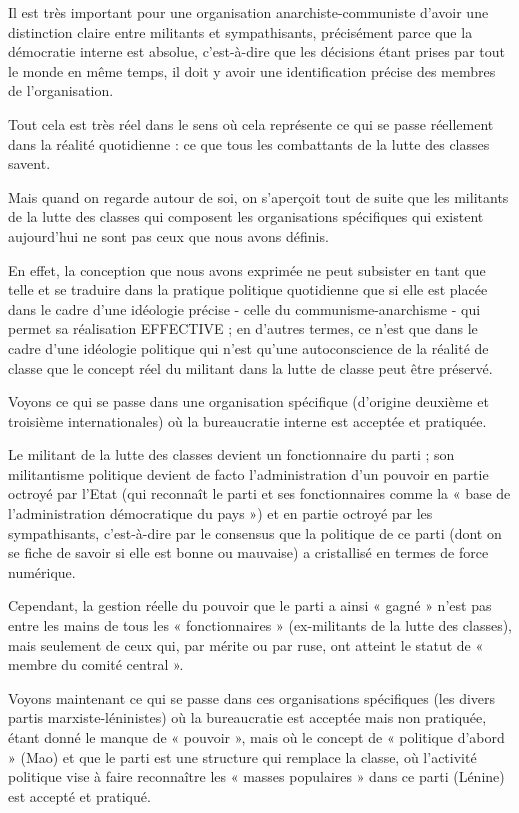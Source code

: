 Il est très important pour une organisation anarchiste-communiste d'avoir une distinction claire entre militants et sympathisants, précisément parce que la démocratie interne est absolue, c'est-à-dire que les décisions étant prises par tout le monde en même temps, il doit y avoir une identification précise des membres de l'organisation.

Tout cela est très réel dans le sens où cela représente ce qui se passe réellement dans la réalité quotidienne : ce que tous les combattants de la lutte des classes savent.

Mais quand on regarde autour de soi, on s'aperçoit tout de suite que les militants de la lutte des classes qui composent les organisations spécifiques qui existent aujourd'hui ne sont pas ceux que nous avons définis.

En effet, la conception que nous avons exprimée ne peut subsister en tant que telle et se traduire dans la pratique politique quotidienne que si elle est placée dans le cadre d'une idéologie précise - celle du communisme-anarchisme - qui permet sa réalisation EFFECTIVE ; en d'autres termes, ce n'est que dans le cadre d'une idéologie politique qui n'est qu'une autoconscience de la réalité de classe que le concept réel du militant dans la lutte de classe peut être préservé.

Voyons ce qui se passe dans une organisation spécifique (d'origine deuxième et troisième internationales) où la bureaucratie interne est acceptée et pratiquée.

Le militant de la lutte des classes devient un fonctionnaire du parti ; son militantisme politique devient de facto l'administration d'un pouvoir en partie octroyé par l'Etat (qui reconnaît le parti et ses fonctionnaires comme la « base de l'administration démocratique du pays ») et en partie octroyé par les sympathisants, c'est-à-dire par le consensus que la politique de ce parti (dont on se fiche de savoir si elle est bonne ou mauvaise) a cristallisé en termes de force numérique.

Cependant, la gestion réelle du pouvoir que le parti a ainsi « gagné » n'est pas entre les mains de tous les « fonctionnaires » (ex-militants de la lutte des classes), mais seulement de ceux qui, par mérite ou par ruse, ont atteint le statut de « membre du comité central ».

Voyons maintenant ce qui se passe dans ces organisations spécifiques (les divers partis marxiste-léninistes) où la bureaucratie est acceptée mais non pratiquée, étant donné le manque de « pouvoir », mais où le concept de « politique d'abord » (Mao) et que le parti est une structure qui remplace la classe, où l'activité politique vise à faire reconnaître les « masses populaires » dans ce parti (Lénine) est accepté et pratiqué.

